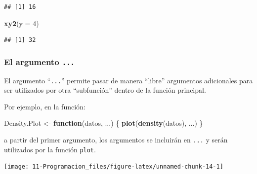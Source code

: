 \documentclass[]{book}
\newenvironment{Shaded}{\begin{snugshade}}{\end{snugshade}}
\newcommand{\ControlFlowTok}[1]{\textcolor[rgb]{0.13,0.29,0.53}{\textbf{#1}}}
\newcommand{\DataTypeTok}[1]{\textcolor[rgb]{0.13,0.29,0.53}{#1}}
\newcommand{\DecValTok}[1]{\textcolor[rgb]{0.00,0.00,0.81}{#1}}
\newcommand{\KeywordTok}[1]{\textcolor[rgb]{0.13,0.29,0.53}{\textbf{#1}}}
\newcommand{\NormalTok}[1]{#1}
\newcommand{\OperatorTok}[1]{\textcolor[rgb]{0.81,0.36,0.00}{\textbf{#1}}}
\newcommand{\StringTok}[1]{\textcolor[rgb]{0.31,0.60,0.02}{#1}}
\begin{document}
\begin{verbatim}
## [1] 16
\end{verbatim}

\begin{Shaded}
\begin{Highlighting}[]
\KeywordTok{xy2}\NormalTok{(}\DataTypeTok{y =} \DecValTok{4}\NormalTok{)}
\end{Highlighting}
\end{Shaded}

\begin{verbatim}
## [1] 32
\end{verbatim}

\hypertarget{el-argumento-...}{%
\subsubsection{\texorpdfstring{El argumento \texttt{...}}{El argumento ...}}\label{el-argumento-...}}

El argumento ``\texttt{...}'' permite
pasar de manera ``libre'' argumentos adicionales para ser utilizados por otra ``subfunción''
dentro de la función principal.

Por ejemplo, en la función:

\begin{Shaded}
\begin{Highlighting}[]
\NormalTok{Density.Plot <-}\StringTok{ }\ControlFlowTok{function}\NormalTok{(datos, ...) \{ }\KeywordTok{plot}\NormalTok{(}\KeywordTok{density}\NormalTok{(datos), ...) \}}
\end{Highlighting}
\end{Shaded}

a partir del primer argumento, los argumentos se incluirán en \texttt{...}
y serán utilizados por la función \texttt{plot}.

\begin{Shaded}
\end{Shaded}

\begin{center}\texttt{[image: 11-Programacion\_files/figure-latex/unnamed-chunk-14-1]} \end{center}

\begin{Shaded}
\end{Shaded}
\end{document}
